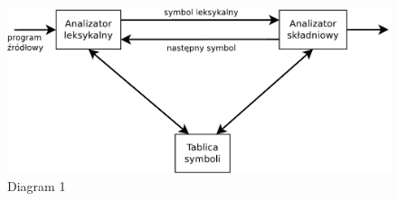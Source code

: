 \documentclass[a4paper,11pt]{article}
\begin{document}
\begin{figure}[!htb]
\centerline{\includegraphics[scale=0.6]{Diagram1.pdf}}
\caption{Diagram 1}
\label{fig:Diagram 1}
\end{figure}
\end{document}
